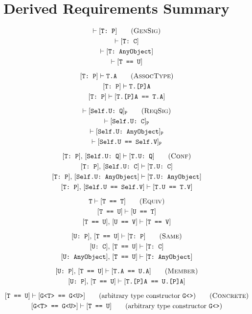 \documentclass[../generics]{subfiles}
\begin{document}
\chapter{Derived Requirements Summary}\label{derived summary}

\index{$\vdash$}

\begin{gather*}
\vdash\ConfReq{T}{P}\tag{\textsc{GenSig}}\\
\vdash\ConfReq{T}{C}\\
\vdash\ConfReq{T}{AnyObject}\\
\vdash\FormalReq{T == U}\\[\medskipamount]
\ConfReq{T}{P}\vdash\texttt{T.A}\tag{\textsc{AssocType}}\\
\ConfReq{T}{P}\vdash\texttt{T.[P]A}\\
\ConfReq{T}{P}\vdash\FormalReq{T.[P]A == T.A}\\[\medskipamount]
\vdash\ConfReq{Self.U}{Q}_\texttt{P}\tag{\textsc{ReqSig}}\\
\vdash\ConfReq{Self.U}{C}_\texttt{P}\\
\vdash\ConfReq{Self.U}{AnyObject}_\texttt{P}\\
\vdash\FormalReq{Self.U == Self.V}_\texttt{P}\\[\medskipamount]
\ConfReq{T}{P},\,\ConfReq{Self.U}{Q}\vdash\ConfReq{T.U}{Q}\tag{\textsc{Conf}}\\
\ConfReq{T}{P},\,\ConfReq{Self.U}{C}\vdash\ConfReq{T.U}{C}\\
\ConfReq{T}{P},\,\ConfReq{Self.U}{AnyObject}\vdash\ConfReq{T.U}{AnyObject}\\
\ConfReq{T}{P},\,\FormalReq{Self.U == Self.V}\vdash\FormalReq{T.U == T.V}\\[\medskipamount]
\texttt{T}\vdash\FormalReq{T == T}\tag{\textsc{Equiv}}\\
\FormalReq{T == U}\vdash\FormalReq{U == T}\\
\FormalReq{T == U},\,\FormalReq{U == V}\vdash\FormalReq{T == V}\\[\medskipamount]
\ConfReq{U}{P},\,\FormalReq{T == U}\vdash\ConfReq{T}{P}\tag{\textsc{Same}}\\
\ConfReq{U}{C},\,\FormalReq{T == U}\vdash\ConfReq{T}{C}\\
\ConfReq{U}{AnyObject},\,\FormalReq{T == U}\vdash\ConfReq{T}{AnyObject}\\[\medskipamount]
\ConfReq{U}{P},\,\FormalReq{T == U}\vdash\FormalReq{T.A == U.A}\tag{\textsc{Member}}\\
\ConfReq{U}{P},\,\FormalReq{T == U}\vdash\FormalReq{T.[P]A == U.[P]A}\\[\medskipamount]
\FormalReq{T == U}\vdash\FormalReq{G<T> == G<U>}\qquad\mbox{(arbitrary type constructor \texttt{G<>})}\tag{\textsc{Concrete}}\\
\FormalReq{G<T> == G<U>}\vdash\FormalReq{T == U}\qquad\mbox{(arbitrary type constructor \texttt{G<>})}
\end{gather*}
\end{document}
